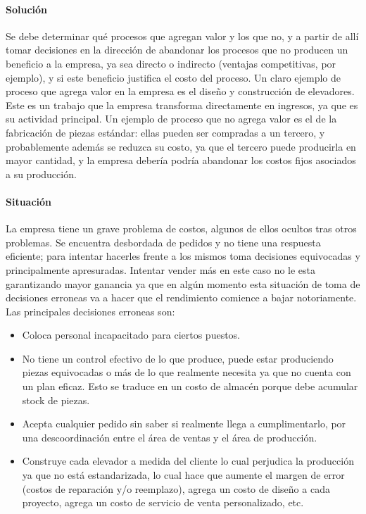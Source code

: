 \documentclass[12pt,a4paper,spanish]{article}
\begin{document}
\paragraph{Soluci\'on}
Se debe determinar qu\'e procesos que agregan valor y los que no, y a partir de all\'i tomar decisiones en la direcci\'on de abandonar los procesos que no producen un beneficio a la empresa, ya sea directo o indirecto (ventajas competitivas, por ejemplo), y si este beneficio justifica el costo del proceso. Un claro ejemplo de proceso que agrega valor en la empresa es el dise\~no y construcci\'on de elevadores. Este es un trabajo que la empresa transforma directamente en ingresos, ya que es su actividad principal. Un ejemplo de proceso que no agrega valor es el de la fabricaci\'on de piezas est\'andar: ellas pueden ser compradas a un tercero, y probablemente adem\'as se reduzca su costo, ya que el tercero puede producirla en mayor cantidad, y la empresa deber\'ia podr\'ia abandonar los costos fijos asociados a su producci\'on.

\paragraph{Situaci\'on}
La empresa tiene un grave problema de costos, algunos de ellos ocultos tras otros problemas. Se encuentra desbordada de pedidos y no tiene una respuesta eficiente; para intentar hacerles frente a los mismos toma decisiones equivocadas y principalmente apresuradas. Intentar vender m\'as en este caso no le esta garantizando mayor ganancia ya que en alg\'un momento esta situaci\'on de toma de decisiones erroneas va a hacer que el rendimiento comience a bajar notoriamente. Las principales decisiones erroneas son:
	\begin{itemize}
 		\item Coloca personal incapacitado para ciertos puestos. 
		\item No tiene un control efectivo de lo que produce, puede estar produciendo piezas equivocadas o m\'as de lo que realmente necesita ya que no cuenta con un plan eficaz. Esto se traduce en un costo de almac\'en porque debe acumular stock de piezas.
		\item Acepta cualquier pedido sin saber si realmente llega a cumplimentarlo, por una descoordinaci\'on entre el \'area de ventas y el \'area de producci\'on.
		\item Construye cada elevador a medida del cliente lo cual perjudica la producci\'on ya que no est\'a estandarizada, lo cual hace que aumente el margen de error (costos de reparaci\'on y/o reemplazo), agrega un costo de dise\~no a cada proyecto, agrega un costo de servicio de venta personalizado, etc.
	\end{itemize}
\end{document}
